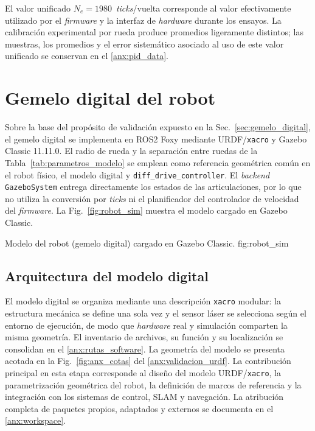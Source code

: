 El valor unificado $N_e=1980$~\textit{ticks}/vuelta corresponde al valor
efectivamente utilizado por el \textit{firmware} y la interfaz de \textit{hardware} durante
los ensayos. La calibración experimental por rueda produce promedios
ligeramente distintos; las muestras, los promedios y el error sistemático
asociado al uso de este valor unificado se conservan en el
\ref{anx:pid_data}.

\section{Gemelo digital del robot}
\label{ch:robot_digital}

Sobre la base del propósito de validación expuesto en la
Sec.~\ref{sec:gemelo_digital}, el gemelo digital se implementa en
\gls{ROS2} Foxy mediante URDF/\texttt{xacro} y Gazebo Classic 11.11.0. El radio de rueda y
la separación entre ruedas de la Tabla~\ref{tab:parametros_modelo} se
emplean como referencia geométrica común en el robot físico, el modelo
digital y \texttt{diff\_drive\_controller}. El \textit{backend}
\texttt{GazeboSystem} entrega directamente los estados de las
articulaciones, por lo que no utiliza la conversión por \textit{ticks} ni el
planificador del controlador de velocidad del \textit{firmware}. La Fig.~\ref{fig:robot_sim} muestra el modelo
cargado en Gazebo Classic.

{Modelo del robot (gemelo digital) cargado en Gazebo Classic.}
{fig:robot_sim}

\subsection{Arquitectura del modelo digital}
\label{sec:atribucion}

El modelo digital se organiza mediante una descripción \texttt{xacro} modular: la estructura mecánica se define una sola vez y el sensor láser se selecciona según el entorno de ejecución, de modo que \textit{hardware} real y simulación comparten la misma geometría. El inventario de archivos, su función y su localización se consolidan en el \ref{anx:rutas_software}. La geometría del modelo se presenta acotada en la Fig.~\ref{fig:anx_cotas} del \ref{anx:validacion_urdf}.
La contribución principal en esta etapa corresponde al diseño del modelo URDF/\texttt{xacro}, la parametrización geométrica del robot, la definición de marcos de referencia y la integración con los sistemas de control, SLAM y navegación. La atribución completa de paquetes propios, adaptados y externos se documenta en el \ref{anx:workspace}.

